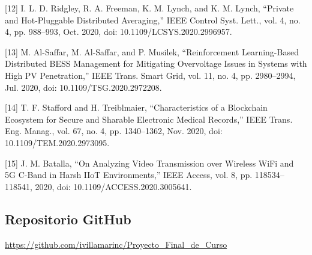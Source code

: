 \documentclass[12pt,a4paper]{article}
\begin{document}
\vspace{0.2cm}

[12]	I. L. D. Ridgley, R. A. Freeman, K. M. Lynch, and K. M. Lynch, “Private and Hot-Pluggable Distributed Averaging,” IEEE Control Syst. Lett., vol. 4, no. 4, pp. 988–993, Oct. 2020, doi: 10.1109/LCSYS.2020.2996957.

\vspace{0.2cm}

[13]	M. Al-Saffar, M. Al-Saffar, and P. Musilek, “Reinforcement Learning-Based Distributed BESS Management for Mitigating Overvoltage Issues in Systems with High PV Penetration,” IEEE Trans. Smart Grid, vol. 11, no. 4, pp. 2980–2994, Jul. 2020, doi: 10.1109/TSG.2020.2972208.

\vspace{0.2cm}

[14]	T. F. Stafford and H. Treiblmaier, “Characteristics of a Blockchain Ecosystem for Secure and Sharable Electronic Medical Records,” IEEE Trans. Eng. Manag., vol. 67, no. 4, pp. 1340–1362, Nov. 2020, doi: 10.1109/TEM.2020.2973095.

\vspace{0.2cm}

[15]	J. M. Batalla, “On Analyzing Video Transmission over Wireless WiFi and 5G C-Band in Harsh IIoT Environments,” IEEE Access, vol. 8, pp. 118534–118541, 2020, doi: 10.1109/ACCESS.2020.3005641.

\vspace{0.2cm}
\subsection*{Repositorio GitHub}

\href{https://github.com/ivillamarinc/Proyecto_Final_de_Curso}{https://github.com/ivillamarinc/Proyecto_Final_de_Curso}
\end{document}
